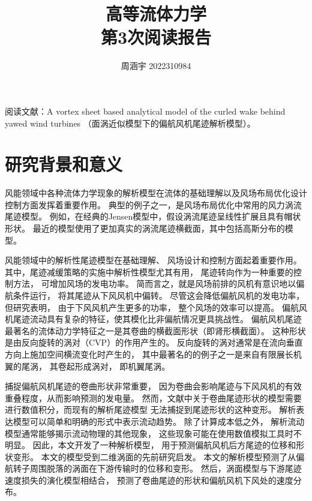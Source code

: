 \documentclass[UTF8,zihao=5]{ctexart} %
\title{{\bfseries\rmfamily\Huge{高等流体力学\hspace{1em}\\第3次阅读报告}}}
\author{周涵宇 2022310984}
\date{}
\begin{document}
\maketitle
\thispagestyle{fancy}



阅读文献：A vortex sheet based analytical model of the curled wake behind yawed wind turbines\cite{bastankhah2022vortex}
（面涡近似模型下的偏航风机尾迹解析模型）。


\section{研究背景和意义}
风能领域中各种流体力学现象的解析模型在流体的基础理解以及风场布局优化设计控制方面发挥着重要作用。
典型的例子之一，是风场布局优化中常用的风力涡流尾迹模型。
例如，在经典的Jensen模型中，假设涡流尾迹呈线性扩展且具有帽状形状。
最近的模型使用了更加真实的涡流尾迹横截面，其中包括高斯分布的模型。

风能领域中的解析性尾迹模型在基础理解、
风场设计和控制方面起着重要作用。
其中，尾迹减缓策略的实施中解析性模型尤其有用，
尾迹转向作为一种重要的控制方法，
可增加风场的发电功率。
简而言之，就是风场前排的风机有意识地以偏航条件运行，
将其尾迹从下风风机中偏转。
尽管这会降低偏航风机的发电功率，但研究表明，
由于下风风机产生更多的功率，
整个风场的效率可以提高。
偏航风机尾迹流动具有复杂的特征，使其模化比非偏航情况更具挑战性。
偏航风机尾迹最著名的流体动力学特征之一是其卷曲的横截面形状（即肾形横截面）。
这种形状是由反向旋转的涡对（CVP）的作用产生的。
反向旋转的涡对通常是在流向垂直方向上施加空间横流变化时产生的，
其中最著名的的例子之一是来自有限展长机翼的尾涡，
其卷起形成涡对，
即机翼尾涡。

捕捉偏航风机尾迹的卷曲形状非常重要，
因为卷曲会影响尾迹与下风风机的有效重叠程度，从而影响预测的发电量。
然而，文献中关于卷曲尾迹形状的模型需要进行数值积分，而现有的解析尾迹模型
无法捕捉到尾迹形状的这种变形。
解析表达模型可以简单和明确的形式中表示流动趋势。
除了计算成本低之外，
解析流动模型通常能够揭示流动物理的其他现象，
这些现象可能在使用数值模拟工具时不明显。
因此，本文开发了一种解析模型，
用于预测偏航风机后方尾迹的位移和形状变形。
本文的模型受到二维涡面的先前研究启发。
本文的解析模型预测了从偏航转子周围脱落的涡面在下游传输时的位移和变形。
然后，涡面模型与下游尾迹速度损失的演化模型相结合，
预测了卷曲尾迹的形状和偏航风机下风处的速度分布。
\end{document}
